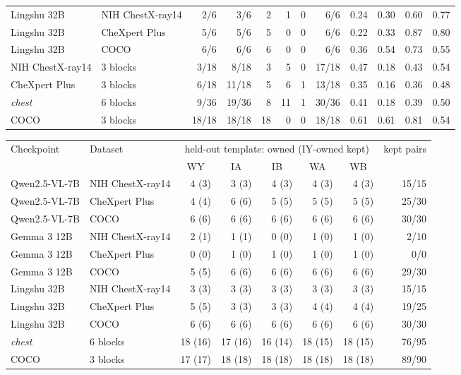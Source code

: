 \documentclass{article}
\begin{document}
\begin{table}[h]
\begin{tabular}{llrrrrrrrrrr}
Lingshu 32B & NIH ChestX-ray14 & 2/6 & 3/6 & 2 & 1 & 0 & 6/6 & 0.24 & 0.30 & 0.60 & 0.77 \\
Lingshu 32B & CheXpert Plus & 5/6 & 5/6 & 5 & 0 & 0 & 6/6 & 0.22 & 0.33 & 0.87 & 0.80 \\
Lingshu 32B & COCO & 6/6 & 6/6 & 6 & 0 & 0 & 6/6 & 0.36 & 0.54 & 0.73 & 0.55 \\
\midrule
NIH ChestX-ray14 & 3 blocks & 3/18 & 8/18 & 3 & 5 & 0 & 17/18 & 0.47 & 0.18 & 0.43 & 0.54 \\
CheXpert Plus & 3 blocks & 6/18 & 11/18 & 5 & 6 & 1 & 13/18 & 0.35 & 0.16 & 0.36 & 0.48 \\
\textit{chest} & 6 blocks & 9/36 & 19/36 & 8 & 11 & 1 & 30/36 & 0.41 & 0.18 & 0.39 & 0.50 \\
COCO & 3 blocks & 18/18 & 18/18 & 18 & 0 & 0 & 18/18 & 0.61 & 0.61 & 0.81 & 0.54 \\
\bottomrule
\end{tabular}

\medskip
\begin{tabular}{llrrrrrr}
\toprule
\multirow{2}{*}{Checkpoint} & \multirow{2}{*}{Dataset} & \multicolumn{5}{c}{held-out template: owned (IY-owned kept)} & \multirow{2}{*}{kept pairs}\\
\cmidrule(lr){3-7}
&  & \multicolumn{1}{c}{WY} & \multicolumn{1}{c}{IA} & \multicolumn{1}{c}{IB} & \multicolumn{1}{c}{WA} & \multicolumn{1}{c}{WB} & \\
\midrule
Qwen2.5-VL-7B & NIH ChestX-ray14 & 4 (3) & 3 (3) & 4 (3) & 4 (3) & 4 (3) & 15/15 \\
Qwen2.5-VL-7B & CheXpert Plus & 4 (4) & 6 (6) & 5 (5) & 5 (5) & 5 (5) & 25/30 \\
Qwen2.5-VL-7B & COCO & 6 (6) & 6 (6) & 6 (6) & 6 (6) & 6 (6) & 30/30 \\
Gemma 3 12B & NIH ChestX-ray14 & 2 (1) & 1 (1) & 0 (0) & 1 (0) & 1 (0) & 2/10 \\
Gemma 3 12B & CheXpert Plus & 0 (0) & 1 (0) & 1 (0) & 1 (0) & 1 (0) & 0/0 \\
Gemma 3 12B & COCO & 5 (5) & 6 (6) & 6 (6) & 6 (6) & 6 (6) & 29/30 \\
Lingshu 32B & NIH ChestX-ray14 & 3 (3) & 3 (3) & 3 (3) & 3 (3) & 3 (3) & 15/15 \\
Lingshu 32B & CheXpert Plus & 5 (5) & 3 (3) & 3 (3) & 4 (4) & 4 (4) & 19/25 \\
Lingshu 32B & COCO & 6 (6) & 6 (6) & 6 (6) & 6 (6) & 6 (6) & 30/30 \\
\midrule
\textit{chest} & 6 blocks & 18 (16) & 17 (16) & 16 (14) & 18 (15) & 18 (15) & 76/95 \\
COCO & 3 blocks & 17 (17) & 18 (18) & 18 (18) & 18 (18) & 18 (18) & 89/90 \\
\bottomrule
\end{tabular}
\end{table}
\end{document}
